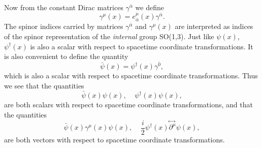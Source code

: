 \documentclass[12pt,twoside]{report} %
\begin{document}
Now from the constant Dirac matrices $\gamma^{\bar{\alpha}}$ we define
\begin{equation}\label{nikolic:a3}
\gamma^{\mu}(x)=e^{\mu}_{\bar{\alpha}}(x) \gamma^{\bar{\alpha}} .
\end{equation}   
The spinor indices carried by matrices $\gamma^{\bar{\alpha}}$ and $\gamma^{\mu}(x)$
are interpreted as indices of the spinor representation of the {\em internal} 
group SO(1,3). 
Just like $\psi(x)$, $\psi^{\dagger}(x)$ is also a scalar with respect to
spacetime coordinate transformations. It is also convenient to define the quantity
\begin{equation}\label{nikolic:a4}
\bar{\psi}(x)=\psi^{\dagger}(x) \gamma^{\bar{0}} ,
\end{equation}
which is also a scalar with respect to spacetime coordinate transformations.
Thus we see that the quantities 
\begin{equation}\label{nikolic:a5}
\bar{\psi}(x)\psi(x) , \;\;\;\; \psi^{\dagger}(x)\psi(x) ,
\end{equation}
are both scalars with respect to spacetime coordinate transformations, and 
that the quantities 
\begin{equation}\label{nikolic:a6}
\bar{\psi}(x)\gamma^{\mu}(x)\psi(x) , \;\;\;\; 
\frac{i}{2}\psi^{\dagger}(x)  \!\stackrel{\leftrightarrow\;}{\partial^{\mu}}\!  \psi(x) ,
\end{equation}
are both vectors with respect to spacetime coordinate transformations.
\end{document}

